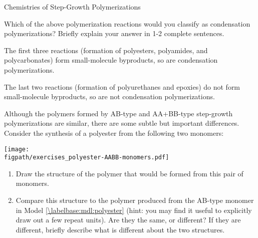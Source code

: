 \begin{activity}{Chemistries of Step-Growth Polymerizations}
\begin{ctqs}
		\vspace{0.25in}
		\question Which of the above polymerization reactions would you classify as condensation polymerizations?  Briefly explain your answer in 1-2 complete sentences.
			
				\begin{solution}[2in]
					The first three reactions (formation of polyesters, polyamides, and polycarbonates) form small-molecule byproducts, so are condensation polymerizations.
					
					The last two reactions (formation of polyurethanes and epoxies) do not form small-molecule byproducts, so are not condensation polymerizations.
				\end{solution}
			
\end{ctqs}
	

\clearpage
\begin{exercises}

		
		\exercise \label{\labelbase:exc:AABBester} Although the polymers formed by AB-type and AA+BB-type step-growth polymerizations are similar, there are some subtle but important differences.
			Consider the synthesis of a polyester from the following two monomers:
			
			\centerline{\texttt{[image: \\figpath/exercises\_polyester-AABB-monomers.pdf]}}	
			
			\begin{enumerate}
				\item Draw the structure of the polymer that would be formed from this pair of monomers.
					
					\begin{solution}\end{solution}
					
				\item Compare this structure to the polymer produced from the AB-type monomer in Model \ref{\labelbase:mdl:polyester} (hint: you may find it useful to explicitly draw out a few repeat units).  Are they the same, or different?  If they are different, briefly describe what is different about the two structures.
					
					\begin{solution}
\end{solution}
\end{enumerate}
\end{exercises}
\end{activity}
